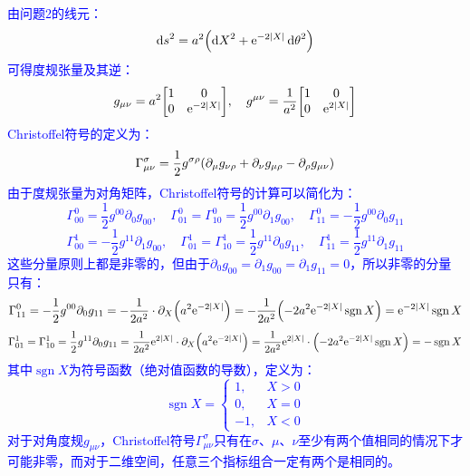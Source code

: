 \documentclass[a4paper]{article}
\DeclareMathOperator{\sgn}{sgn}
\begin{document}
\begin{enumerate}
    \textcolor{blue}{
    由问题2的线元：
    \[
        \dd{s}^2 = a^2 \qty(\dd{X}^2 + \mathrm{e}^{-2|X|} \dd{\theta}^2)
    \]
    可得度规张量及其逆：
    \[
        g_{\mu\nu} = a^2 \mqty[1 & 0 \\ 0 & \mathrm{e}^{-2|X|}],\quad g^{\mu\nu} = \frac{1}{a^2} \mqty[1 & 0 \\ 0 & \mathrm{e}^{2|X|}]
    \]
    Christoffel符号的定义为：
    \[
        \Gamma^\sigma_{\mu\nu} = \frac{1}{2} g^{\sigma\rho} \qty(\partial_\mu g_{\nu\rho} + \partial_\nu g_{\mu\rho} - \partial_\rho g_{\mu\nu})
    \]
    由于度规张量为对角矩阵，Christoffel符号的计算可以简化为：
    \[
        \Gamma^0_{00} = \frac{1}{2} g^{00} \partial_0 g_{00},\quad \Gamma^0_{01} = \Gamma^0_{10} = \frac{1}{2} g^{00} \partial_1 g_{00},\quad \Gamma^0_{11} = - \frac{1}{2} g^{00} \partial_0 g_{11}
    \]
    \[
        \Gamma^1_{00} = -\frac{1}{2} g^{11} \partial_1 g_{00},\quad \Gamma^1_{01} = \Gamma^1_{10} = \frac{1}{2} g^{11} \partial_0 g_{11},\quad \Gamma^1_{11} = \frac{1}{2} g^{11} \partial_1 g_{11}
    \]
    这些分量原则上都是非零的，但由于$\partial_0 g_{00} = \partial_1 g_{00} = \partial_1 g_{11} = 0$，所以非零的分量只有：
    \[
        \Gamma^0_{11} = -\frac{1}{2} g^{00} \partial_0 g_{11} = -\frac{1}{2a^2} \cdot \partial_X \qty(a^2 \mathrm{e}^{-2|X|}) = -\frac{1}{2a^2} \qty(-2a^2 \mathrm{e}^{-2|X|} \sgn{X}) = \mathrm{e}^{-2|X|} \sgn{X}
    \]
    \[
        \Gamma^1_{01} = \Gamma^1_{10} = \frac{1}{2} g^{11} \partial_0 g_{11} = \frac{1}{2a^2} \mathrm{e}^{2|X|} \cdot \partial_X \qty(a^2 \mathrm{e}^{-2|X|}) = \frac{1}{2a^2} \mathrm{e}^{2|X|} \cdot \qty(-2a^2 \mathrm{e}^{-2|X|} \sgn{X}) = -\sgn{X}
    \]
    其中$\sgn{X}$为符号函数（绝对值函数的导数），定义为：
    \[
        \sgn{X} =
        \begin{cases}
            1, & X > 0 \\
            0, & X = 0 \\
            -1, & X < 0
        \end{cases}
    \]
    对于对角度规$g_{\mu\nu}$，Christoffel符号$\Gamma^\sigma_{\mu\nu}$只有在$\sigma$、$\mu$、$\nu$至少有两个值相同的情况下才可能非零，而对于二维空间，任意三个指标组合一定有两个是相同的。
    }
\end{enumerate}
\end{document}
